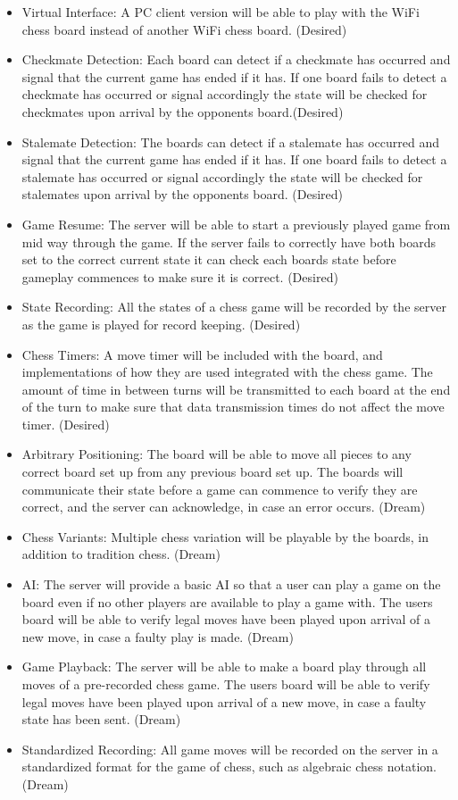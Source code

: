 \documentclass{article}
\begin{document}
\begin{itemize}

	\item Virtual Interface: A PC client version will be able to play with the WiFi chess board instead of another WiFi chess board. (Desired)
	\item Checkmate Detection: Each board can detect if a checkmate has occurred and signal that the current game has ended if it has. If one board fails to detect a checkmate has occurred or signal accordingly the state will be checked for checkmates upon arrival by the opponents board.(Desired)
	\item Stalemate Detection: The boards can detect if a stalemate has occurred and signal that the current game has ended if it has. If one board fails to detect a stalemate has occurred or signal accordingly the state will be checked for stalemates upon arrival by the opponents board. (Desired)
	\item Game Resume: The server will be able to start a previously played game from mid way through the game. If the server fails to correctly have both boards set to the correct current state it can check each boards state before gameplay commences to make sure it is correct. (Desired)
	\item State Recording: All the states of a chess game will be recorded by the server as the game is played for record keeping. (Desired)
	\item Chess Timers: A move timer will be included with the board, and implementations of how they are used integrated with the chess game. The amount of time in between turns will be transmitted to each board at the end of the turn to make sure that data transmission times do not affect the move timer. (Desired)


	\item Arbitrary Positioning: The board will be able to move all pieces to any correct board set up from any previous board set up. The boards will communicate their state before a game can commence to verify they are correct, and the server can acknowledge, in case an error occurs. (Dream)
	\item Chess Variants: Multiple chess variation will be playable by the boards, in addition to tradition chess. (Dream)
	\item AI: The server will provide a basic AI so that a user can play a game on the board even if no other players are available to play a game with. The users board will be able to verify legal moves have been played upon arrival of a new move, in case a faulty play is made. (Dream)
	\item Game Playback: The server will be able to make a board play through all moves of a pre-recorded chess game. The users board will be able to verify legal moves have been played upon arrival of a new move, in case a faulty state has been sent. (Dream)
	\item Standardized Recording: All game moves will be recorded on the server in a standardized format for the game of chess, such as algebraic chess notation. (Dream)

\end{itemize}
\end{document}
